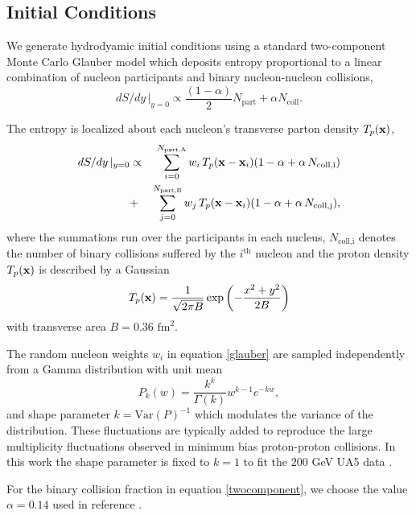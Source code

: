 \documentclass[aps,prc,reprint,amsmath,nofootinbib,superscriptaddress]{revtex4-1}
\begin{document}
\subsection{Initial Conditions}

We generate hydrodyamic initial conditions using a standard two-component Monte Carlo Glauber model which deposits entropy proportional to a linear 
combination of nucleon participants and binary nucleon-nucleon collisions,
\begin{equation}
 dS/dy \,\vert_{y=0} \propto \frac{(1-\alpha)}{2}N_\text{part} + \alpha N_\text{coll}.
 \label{twocomponent}
\end{equation}

The entropy is localized about each nucleon's transverse parton density $T_p({\bf x})$,
\begin{eqnarray}
 dS/dy \,\vert_{y=0} &\propto& \sum\limits_{i=0}^{N_\text{part,A}} w_i\, T_p({\bf x} - {\bf x}_i)(1-\alpha + \alpha\, N_\text{coll,i}) \nonumber \\
                     &+& \sum\limits_{j=0}^{N_\text{part,B}} w_j\, T_p({\bf x} - {\bf x}_i)(1-\alpha + \alpha\, N_\text{coll,j}),
 \label{glauber}
\end{eqnarray}
where the summations run over the participants in each nucleus, $N_\text{coll,i}$ denotes the number of binary collisions suffered by the $i^\text{th}$ 
nucleon and the proton density $T_p({\bf x})$ is described by a Gaussian
\begin{equation}
 T_p({\bf x}) = \frac{1}{\sqrt{2 \pi B}} \exp \left(-\frac{x^2+y^2}{2 B} \right)
\end{equation}
with transverse area $B = 0.36$ $\text{fm}^2$.

The random nucleon weights $w_i$ in equation \eqref{glauber} are sampled independently from a Gamma distribution with unit mean
\begin{equation}
 P_k(w) = \frac{k^k}{\Gamma(k)} w^{k-1} e^{-k w},
\end{equation}
and shape parameter $k = \text{Var}(P)^{-1}$ which modulates the variance of the distribution. These fluctuations are typically added \cite{?} to reproduce 
the large multiplicity fluctuations observed in minimum bias proton-proton collisions. In this work the shape parameter is fixed to $k=1$ to fit the $200$ 
GeV UA5 data \cite{?}. 

For the binary collision fraction in equation \eqref{twocomponent}, we choose the value $\alpha=0.14$ used in reference \cite{?}.
\end{document}

